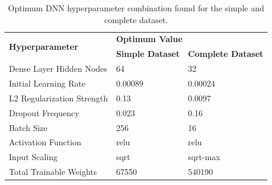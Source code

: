 




\begin{table}[H]
\centering
\caption{Optimum DNN hyperparameter combination found for the simple and complete dataset.}
\label{table:hyperparameter_opt_parameters_DNN}
\begin{tabular}{lll}
\hline
\multirow{2}{*}{\textbf{Hyperparameter}} & \multicolumn{2}{l}{\textbf{Optimum Value}} \\
 & \textbf{Simple Dataset} & \textbf{Complete Dataset} \\ \hline
Dense Layer Hidden Nodes & 64 & 32 \\
Initial Learning Rate & 0.00089 & 0.00024 \\
L2 Regularization Strength & 0.13 & 0.0097 \\
Dropout Frequency & 0.023 & 0.16 \\
Batch Size & 256 & 16 \\
Activation Function & relu & relu \\
Input Scaling & sqrt & sqrt-max \\ 
Total Trainable Weights & 67550 & 540190 \\ \hline
\end{tabular}
\end{table}





